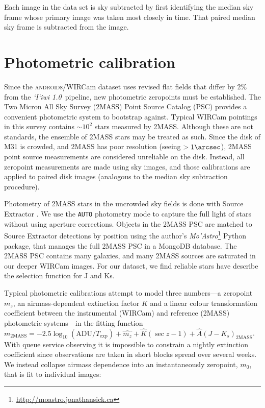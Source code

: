 \documentclass[iop]{emulateapj}
\newcommand{\sw}[1]{\textit{#1}} %
\newcommand{\iiwione}{\sw{`I`iwi 1.0}}
\newcommand{\androids}{\textsc{androids}}
\newcommand{\todo}[1]{\textcolor{RedOrange}{#1}} %
\begin{document}
Each image in the data set is sky subtracted by first identifying the median sky frame whose primary image was taken most closely in time. That paired median sky frame is subtracted from the image.


\section{Photometric calibration}
\label{sec:photocal}

Since the \androids/WIRCam dataset uses revised flat fields that differ by 2\% from the \iiwione\ pipeline, new photometric zeropoints must be established.
The Two Micron All Sky Survey (2MASS) Point Source Catalog (PSC) \citep{Skrutskie:2006} provides a convenient photometric system to bootstrap against.
Typical WIRCam pointings in this survey contains $\sim 10^2$ stars measured by 2MASS.
Although these are not standards, the ensemble of 2MASS stars may be treated as such.
Since the disk of M31 is crowded, and 2MASS has poor resolution (seeing $> 1\arcsec$), 2MASS point source measurements are considered unreliable on the disk.
Instead, all zeropoint measurements are made using sky images, and those calibrations are applied to paired disk images (analogous to the median sky subtraction procedure).

Photometry of 2MASS stars in the uncrowded sky fields is done with Source Extractor \citep{Bertin:1996}.
We use the \texttt{AUTO} photometry mode to capture the full light of stars without using aperture corrections.
Objects in the 2MASS PSC are matched to Source Extractor detections by position using the author's \sw{Mo'Astro}\footnote{\url{http://moastro.jonathansick.ca}} Python package, that manages the full 2MASS PSC in a MongoDB database.
The 2MASS PSC contains many galaxies, and many 2MASS sources are saturated in our deeper WIRCam images.
For our dataset, we find reliable stars have \todo{describe the selection function for J and Ks}.

Typical photometric calibrations attempt to model three numbers---a zeropoint $m_z$, an airmass-dependent extinction factor $K$ and a linear colour transformation coefficient between the instrumental (WIRCam) and reference (2MASS) photometric systems---in the fitting function $m_\mathrm{2MASS} = -2.5 \log_{10}(\mathrm{ADU}/T_\mathrm{exp}) + \hat{m_z} + \hat{K} (\sec z -1) + \hat{A} (J-K_s)_\mathrm{2MASS}$.
With queue service observing it is impossible to constrain a nightly extinction coefficient since observations are taken in short blocks spread over several weeks.
We instead collapse airmass dependence into an instantaneously zeropoint, $m_0$, that is fit to individual images:
\end{document}

